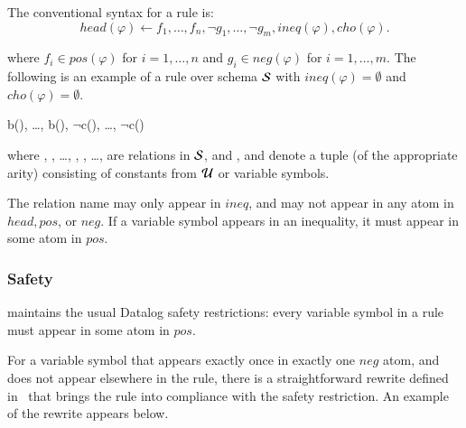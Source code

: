 The conventional syntax for a rule is:
$$head(\varphi) \leftarrow f_1,\ldots,f_n,\lnot g_1,\ldots,\lnot g_m, ineq(\varphi), cho(\varphi).$$

where $f_i \in pos(\varphi)$ for $i = 1,\ldots,n$ and $g_i \in neg(\varphi)$ for $i = 1,\ldots,m$.  The following is an example of a rule over schema $\schema$ with $ineq(\varphi) = \emptyset$ and $cho(\varphi) = \emptyset$.

\begin{Drules}
        {b(), \ldots, b(), $\lnot$c(), \ldots, $\lnot$c()}
\end{Drules}

\noindent where , , \ldots, ,
, \ldots,  are relations in $\schema$, and ,
 and  denote a tuple (of the appropriate arity)
consisting of constants from $\univ$ or variable symbols.

The relation name \dedalus{<} may only appear in $ineq$, and may not appear in any atom in $head, pos$, or $neg$.  If a variable symbol  appears in an inequality, it must appear in some atom in $pos$.


\subsubsection{Safety}
\lang maintains the usual Datalog safety restrictions: every variable symbol
 in a rule must appear in some atom in $pos$.

For a variable symbol  that appears exactly once in exactly one $neg$ atom, and does not appear elsewhere in the rule, there is a straightforward rewrite defined in~\cite{ullmanbook} that brings the rule into compliance with the safety restriction.  An example of the rewrite appears below.

